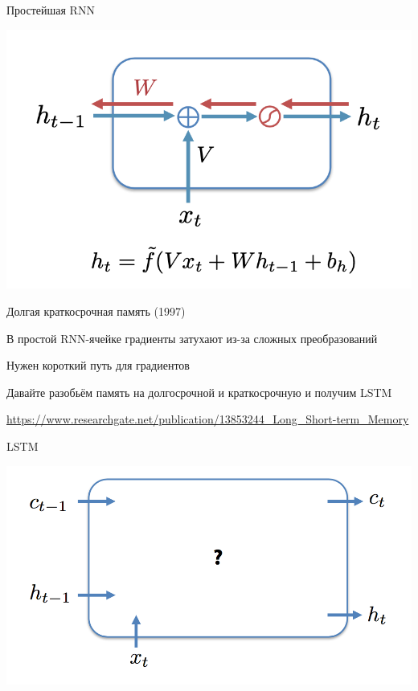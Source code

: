 \documentclass[notes,12pt, aspectratio=169]{beamer}
\newenvironment{wideitemize}{\itemize\addtolength{\itemsep}{10pt}}{\enditemize}
\begin{document}
\begin{frame}{Простейшая RNN}
\begin{center}
	\includegraphics[width=.65\linewidth]{rnn14_2.png}
\end{center}
\end{frame}


\begin{frame}{Долгая краткосрочная память (1997)}
\begin{wideitemize}
	\item В  простой RNN-ячейке градиенты затухают из-за сложных преобразований
	\item Нужен короткий путь для градиентов 
	\item Давайте разобьём память на долгосрочной и краткосрочную и получим LSTM
\end{wideitemize}

\vspace{2.5cm}
\footnotesize 
\color{blue} \url{https://www.researchgate.net/publication/13853244\_Long\_Short-term\_Memory} 
\end{frame}


\begin{frame}{LSTM}
\begin{center}
	\includegraphics[width=.8\linewidth]{lstm1.png}
\end{center}
\end{frame}
\end{document}
